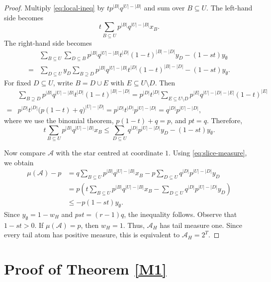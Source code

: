 \documentclass[11pt]{article}
\begin{document}
\begin{proof}
Multiply \eqref{eq:local-ineq} by $t p^{|B|}q^{|U|-|B|}$ and sum over
$B\subseteq U$. The left-hand side becomes
$$
t\sum_{B\subseteq U}p^{|B|}q^{|U|-|B|}x_B.
$$
The right-hand side becomes
\begin{align*}
&\sum_{B\subseteq U}\sum_{D\subseteq B}
p^{|B|}q^{|U|-|B|}t^{|D|}(1-t)^{|B|-|D|}y_D-(1-st)y_\emptyset\\
=&\sum_{D\subseteq U}y_D
\sum_{B\supseteq D}
p^{|B|}q^{|U|-|B|}t^{|D|}(1-t)^{|B|-|D|}-(1-st)y_\emptyset.
\end{align*}
 For fixed $D\subseteq U$, write $B=D\cup E$ with $E\subseteq U\setminus D$. Then
\begin{align*}
 &\sum_{B\supseteq D}
p^{|B|}q^{|U|-|B|}t^{|D|}(1-t)^{|B|-|D|}
=
p^{|D|}t^{|D|}
\sum_{E\subseteq U\setminus D}
p^{|E|}q^{|U|-|D|-|E|}(1-t)^{|E|}\\
=&
p^{|D|}t^{|D|}
\bigl(p(1-t)+q\bigr)^{|U|-|D|}
=
p^{|D|}t^{|D|}
p^{|U|-|D|}
=
q^{|D|}p^{|U|-|D|},
\end{align*}
where we use the binomial theorem, $p(1-t)+q=p$, and $pt=q$.
Therefore, 
\begin{equation}\label{eq:weighted-local}
 t\sum_{B\subseteq U}p^{|B|}q^{|U|-|B|}x_B
 \le \sum_{D\subseteq U}q^{|D|}p^{|U|-|D|}y_D-(1-st)y_\emptyset.
\end{equation}

Now compare $\mathcal{A}$ with the star centred at coordinate $1$.  Using
\eqref{eq:slice-measure}, we obtain
\begin{align*}
 \mu(\mathcal{A})-p
 &=q\sum_{B\subseteq U}p^{|B|}q^{|U|-|B|}x_B
   -p\sum_{D\subseteq U}q^{|D|}p^{|U|-|D|}y_D \\
 &=p\left(
 t\sum_{B\subseteq U}p^{|B|}q^{|U|-|B|}x_B
 -\sum_{D\subseteq U}q^{|D|}p^{|U|-|D|}y_D\right) \\
 &\le -p(1-st)y_\emptyset.
\end{align*}
Since $y_\emptyset=1-w_H$ and $pst=(r-1)q$, the inequality follows.
Observe that $1-st>0$.
If $\mu(\mathcal{A})=p$, then $w_H=1$. Thus, $\mathcal{A}_H$ has tail measure one. Since every tail
atom has positive measure, this is equivalent to $\mathcal{A}_H=2^T$.
\end{proof}















\section{Proof of Theorem \ref{M1}}\label{se4}
\end{document}
